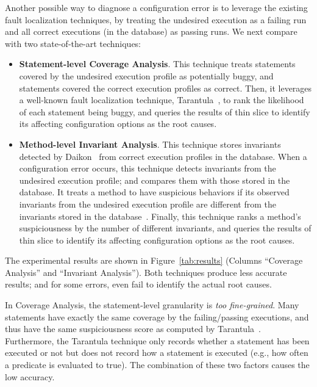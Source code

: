

Another possible way to diagnose a configuration error is to leverage
the existing fault localization techniques, by treating the undesired
execution as a failing run and all correct executions (in the database)
as passing runs. We next compare \ourtool with two state-of-the-art
techniques: %

\begin{itemize}
\item \textbf{Statement-level Coverage Analysis}. This technique treats statements covered
by the undesired execution profile as potentially buggy, and statements
covered the correct execution profiles as correct.
Then, it leverages a well-known fault localization technique,
Tarantula~\cite{Jones:2002}, to rank the likelihood of each
statement being buggy, and queries the results of thin slice
to identify its affecting configuration options as the root causes.

\item \textbf{Method-level Invariant Analysis}. This technique stores invariants detected
by Daikon~\cite{Ernst:1999} from correct execution profiles in the database.
When a configuration error occurs, this technique detects invariants from the undesired execution profile;
and compares them with those stored in the database.
It treats a method to have suspicious behaviors if its observed invariants
from the undesired execution profile are different from the invariants stored
in the database~\cite{McCamant:2003}. Finally, this technique ranks a method's suspiciousness by
the number of different invariants, and queries the results of thin slice
to identify its affecting configuration options as the root causes. 
\end{itemize}


The experimental results are shown in Figure~\ref{tab:results} (Columns
``Coverage Analysis'' and ``Invariant Analysis'').
Both techniques produce less
accurate results; and for some errors, even fail to identify
the actual root causes.

In Coverage Analysis, the statement-level granularity is \textit{too fine-grained}.
Many statements have exactly the same coverage by the failing/passing executions,
and thus have the same suspiciousness score as computed by Tarantula~\cite{Jones:2002}.
Furthermore, the Tarantula technique only records whether a
statement has been executed or not but does not record how a statement is 
executed (e.g., how often a predicate is evaluated to true). The combination
of these two factors causes the low accuracy.


